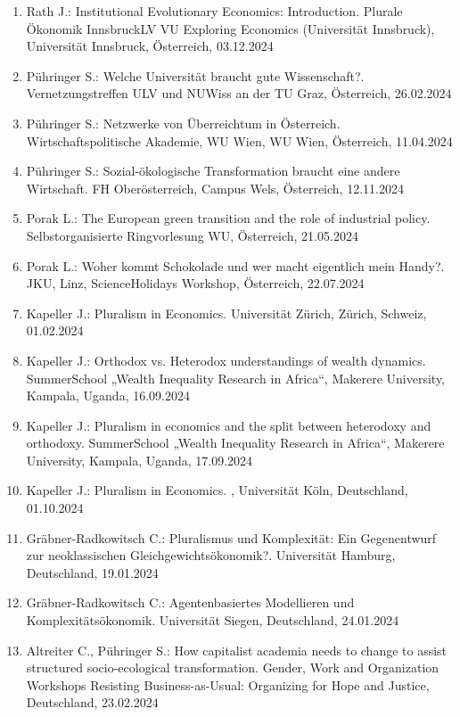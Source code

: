 \begin{enumerate}
	\item Rath J.: Institutional Evolutionary Economics: Introduction. Plurale Ökonomik InnsbruckLV VU Exploring Economics (Universität Innsbruck), Universität Innsbruck, Österreich, 03.12.2024
	\item Pühringer S.: Welche Universität braucht gute Wissenschaft?. Vernetzungstreffen ULV und NUWiss an der TU Graz, Österreich, 26.02.2024
	\item Pühringer S.: Netzwerke von Überreichtum in Österreich. Wirtschaftspolitische Akademie, WU Wien, WU Wien, Österreich, 11.04.2024
	\item Pühringer S.: Sozial-ökologische Transformation braucht eine andere Wirtschaft. FH Oberösterreich, Campus Wels, Österreich, 12.11.2024
	\item Porak L.: The European green transition and the role of industrial policy. Selbstorganisierte Ringvorlesung WU, Österreich, 21.05.2024
	\item Porak L.: Woher kommt Schokolade und wer macht eigentlich mein Handy?. JKU, Linz, ScienceHolidays Workshop, Österreich, 22.07.2024
	\item Kapeller J.: Pluralism in Economics. Universität Zürich, Zürich, Schweiz, 01.02.2024
	\item Kapeller J.: Orthodox vs. Heterodox understandings of wealth dynamics. SummerSchool „Wealth Inequality Research in  Africa“, Makerere University, Kampala, Uganda, 16.09.2024
	\item Kapeller J.: Pluralism in economics and the split between heterodoxy and orthodoxy. SummerSchool „Wealth Inequality Research in  Africa“, Makerere University, Kampala, Uganda, 17.09.2024
	\item Kapeller J.: Pluralism in Economics. , Universität Köln, Deutschland, 01.10.2024
	\item Gräbner-Radkowitsch C.: Pluralismus und Komplexität: Ein Gegenentwurf zur neoklassischen Gleichgewichtsökonomik?. Universität Hamburg, Deutschland, 19.01.2024
	\item Gräbner-Radkowitsch C.: Agentenbasiertes Modellieren und Komplexitätsökonomik. Universität Siegen, Deutschland, 24.01.2024
	\item Altreiter C., Pühringer S.: How capitalist academia needs to change to assist structured socio-ecological transformation. Gender, Work and Organization Workshops Resisting Business-as-Usual: Organizing for Hope and Justice, Deutschland, 23.02.2024
\end{enumerate}


